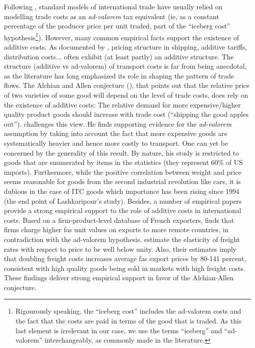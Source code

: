 \documentclass[a4paper,11pt]{article}
\begin{document}
Following \citet{samuelson1954}, standard models of international trade have usually relied on modelling trade costs as an \emph{ad-valorem} tax equivalent (ie, as a constant percentage of the producer price per unit traded, part of the ``iceberg cost'' hypothesis\footnote{Rigourously speaking, the ``iceberg cost'' includes the ad-valorem costs and the fact that the costs are paid in terms of the good that is traded. As this last element is irrelevant in our case, we use the terms ``iceberg'' and ``ad-valorem'' interchangeably, as commonly made in the literature.}). However, many common empirical facts support the existence of additive costs. As documented by \citet{Irrazabal_2015}, pricing structure in shipping, additive tariffs, distribution costs... often exhibit (at least partly) an additive structure. The structure (additive vs ad-valorem) of transport costs is far from being anecdotal, as the literature has long emphasized its role in shaping the pattern of trade flows. The Alchian and Allen conjecture (\citealp{alchian}), that points out that the relative price of two varieties of some good will depend on the level of trade costs, does rely on the existence of additive costs: The relative demand for more expensive/higher quality product goods should increase with trade cost (``shipping the good apples out''). \citet{Lashkaripour-mimeo-2016} challenges this view. He finds supporting evidence for the \emph{ad-valorem} assumption by taking into account the fact that more expensive goods are systematically heavier and hence more costly to transport. One can yet be concerned by the generality of this result. By nature, his study is restricted to goods that are enumerated by items in the statistics (they represent 60\% of US imports). Furthermore, while the positive correlation between weight and price seems reasonable for goods from the second industrial revolution like cars, it is dubious in the case of ITC goods which importance has been rising since 1994 (the end point of Lashkaripour's study). Besides, a number of empirical papers provide a strong empirical support to the role of additive costs in international costs. Based on a firm-product-level database of French exporters, \citet{martin2012} finds that firms charge higher fas unit values on exports to more remote countries, in contradiction with the ad-valorem hypothesis. \citet{hummels_skiba} estimate the elasticity of freight rates with respect to price to be well below unity. Also, their estimates imply that doubling freight costs increases average fas export prices by 80-141 percent, consistent with high quality goods being sold in markets with high freight costs. These findings deliver strong empirical support in favor of the Alchian-Allen conjecture.
\smallskip
\end{document}
